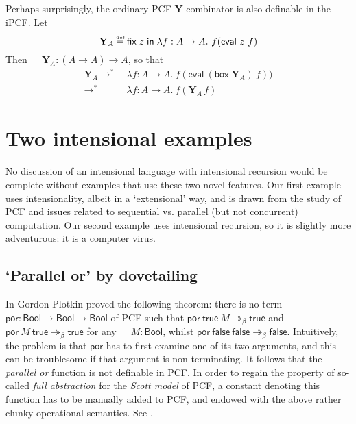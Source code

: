 \documentclass{myifcolog}
\theoremstyle{definition}
\newcommand{\defeq}{\stackrel{\mathclap{\mbox{\tiny def}}}{=}}
\newcommand{\ibox}[1]{\mathsf{box\;}#1}
\newcommand{\fixlob}[2]{\mathsf{fix\;} #1 \mathsf{\;in\;} #2}
\newcommand{\redt}{\mathrel{\longrightarrow^\ast}}
\begin{document}
\begin{description}
Perhaps surprisingly, the ordinary PCF $\mathbf{Y}$ combinator is
also definable in the iPCF.  Let \[
  \mathbf{Y}_A \defeq
    \fixlob{z}{
      \lambda f : A \rightarrow A.\
        f (\mathsf{eval}\ z\  f)
    }
\] Then $\vdash \mathbf{Y}_A : (A \rightarrow A) \rightarrow A$,
so that \begin{align*}
  \mathbf{Y}_A
    \redt{}\
  &\lambda f : A \rightarrow A.\ f (\mathsf{eval}\ (\ibox{\mathbf{Y}_A})\ f)) \\
    \redt{}\
  &\lambda f : A \rightarrow A.\ f (\mathbf{Y}_A\, f)
\end{align*}


\end{description}


\section{Two intensional examples}
  \label{sec:ipcfexamples}

No discussion of an intensional language with intensional
recursion would be complete without examples that use these two
novel features. Our first example uses intensionality, albeit in a
`extensional' way, and is drawn from the study of PCF and issues
related to sequential vs. parallel (but not concurrent)
computation. Our second example uses intensional recursion, so it
is slightly more adventurous: it is a computer virus.

\subsection{`Parallel or' by dovetailing}

In \cite{Plotkin1977} Gordon Plotkin proved the following
theorem: there is no term $\mathsf{por} : \mathsf{Bool}
\rightarrow \mathsf{Bool} \rightarrow \mathsf{Bool}$ of PCF such
that $\mathsf{por}\ \mathsf{true}\ M \twoheadrightarrow_\beta
\mathsf{true}$ and  $\mathsf{por}\ M\ \mathsf{true}
\twoheadrightarrow_\beta \mathsf{true}$ for any $\vdash M :
\mathsf{Bool}$, whilst $\mathsf{por}\ \mathsf{false}\
\mathsf{false} \twoheadrightarrow_\beta \mathsf{false}$.
Intuitively, the problem is that $\mathsf{por}$ has to first
examine one of its two arguments, and this can be troublesome if
that argument is non-terminating. It follows that the
\emph{parallel or} function is not definable in PCF. In order to
regain the property of so-called \emph{full abstraction} for the
\emph{Scott model} of PCF, a constant denoting this function has
to be manually added to PCF, and endowed with the above rather
clunky operational semantics. See
\cite{Plotkin1977,Gunter1992,Mitchell1996,Streicher2006}.
\end{document}
